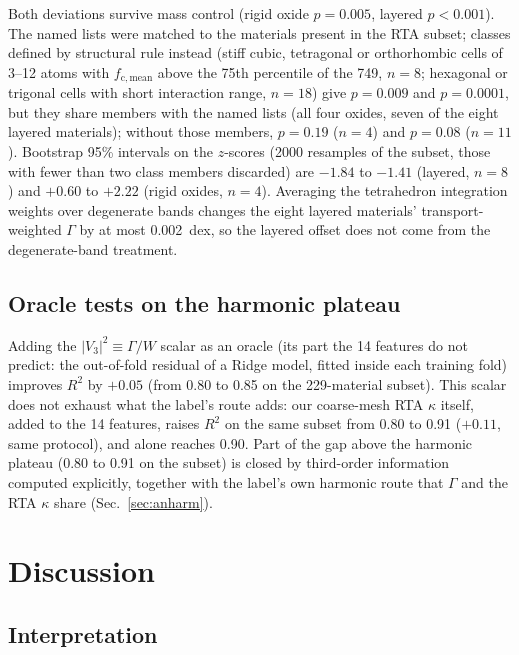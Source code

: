 \documentclass[aps,prm,reprint,onecolumn,groupedaddress]{revtex4-2}
\begin{document}
Both deviations survive mass control (rigid oxide $p = 0.005$, layered $p < 0.001$). The named lists were matched to the materials present in the RTA subset; classes defined by structural rule instead (stiff cubic, tetragonal or orthorhombic cells of 3--12 atoms with $f_\mathrm{c,mean}$ above the 75th percentile of the 749, $n = 8$; hexagonal or trigonal cells with short interaction range, $n = 18$) give $p = 0.009$ and $p = 0.0001$, but they share members with the named lists (all four oxides, seven of the eight layered materials); without those members, $p = 0.19$ ($n = 4$) and $p = 0.08$ ($n = 11$). Bootstrap 95\% intervals on the $z$-scores (2000 resamples of the subset, those with fewer than two class members discarded) are $-1.84$ to $-1.41$ (layered, $n = 8$) and $+0.60$ to $+2.22$ (rigid oxides, $n = 4$). Averaging the tetrahedron integration weights over degenerate bands changes the eight layered materials' transport-weighted $\Gamma$ by at most 0.002~dex, so the layered offset does not come from the degenerate-band treatment.

\subsection{Oracle tests on the harmonic plateau}
\label{sec:oracle}

Adding the $|V_3|^2 \equiv \Gamma/W$ scalar as an oracle (its part the 14 features do not predict: the out-of-fold residual of a Ridge model, fitted inside each training fold) improves $R^2$ by $+0.05$ (from 0.80 to 0.85 on the 229-material subset). This scalar does not exhaust what the label's route adds: our coarse-mesh RTA $\kappa$ itself, added to the 14 features, raises $R^2$ on the same subset from 0.80 to 0.91 ($+0.11$, same protocol), and alone reaches 0.90. Part of the gap above the harmonic plateau (0.80 to 0.91 on the subset) is closed by third-order information computed explicitly, together with the label's own harmonic route that $\Gamma$ and the RTA $\kappa$ share (Sec.~\ref{sec:anharm}).

\section{Discussion}

\subsection{Interpretation}
\end{document}
